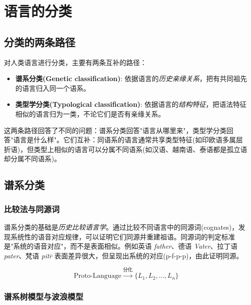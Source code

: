 \clearpage
\vspace*{\fill}
\section{语言的分类}
\vspace*{\fill}
\clearpage


\subsection{分类的两条路径}

对人类语言进行分类，主要有两条互补的路径：
\begin{itemize}
    \item \textbf{谱系分类(Genetic classification)}: 依据语言的\emph{历史亲缘关系}，把有共同祖先的语言归入同一个语系。
    \item \textbf{类型学分类(Typological classification)}: 依据语言的\emph{结构特征}，把语法特征相似的语言归为一类，不论它们是否有亲缘关系。
\end{itemize}

这两条路径回答了不同的问题：谱系分类回答"语言从哪里来"，类型学分类回答"语言是什么样"。它们互补：同语系的语言通常共享类型特征(如印欧语多属屈折语)，但类型上相似的语言可以分属不同语系(如汉语、越南语、泰语都是孤立语却分属不同语系)。

\subsection{谱系分类}

\subsubsection{比较法与同源词}

谱系分类的基础是\emph{历史比较语言学}。通过比较不同语言中的同源词(cognates)，发现系统性的语音对应规律，可以证明它们同源并重建祖语。同源词的判定标准是"系统的语音对应"，而不是表面相似。例如英语 \emph{father}、德语 \emph{Vater}、拉丁语 \emph{pater}、梵语 \emph{pit\=r} 表面差异很大，但呈现出系统的对应(p-f-p-p)，由此证明同源。

\begin{equation}
    \text{Proto-Language} \xrightarrow{\text{分化}} \{L_1, L_2, \ldots, L_n\}
\end{equation}

\subsubsection{谱系树模型与波浪模型}

